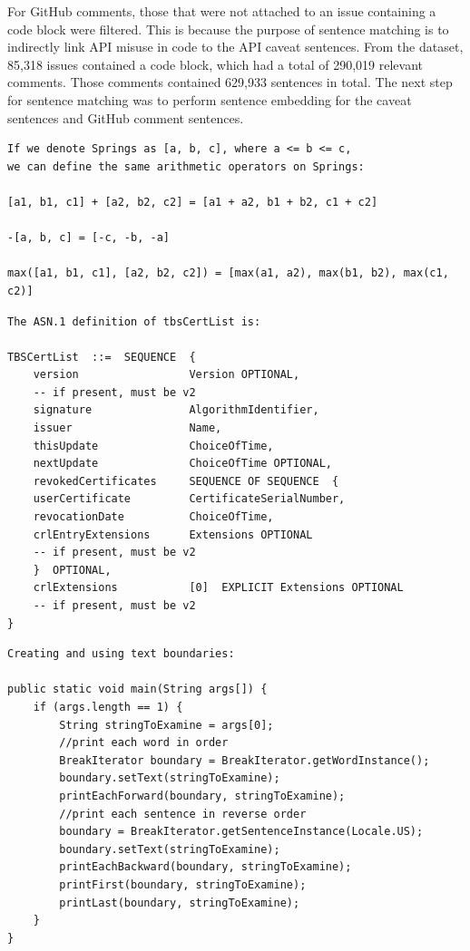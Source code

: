 For GitHub comments, those that were not attached to an issue containing a code block were filtered. This is because the purpose of sentence matching is to indirectly link API misuse in code to the API caveat sentences. From the dataset, 85,318 issues contained a code block, which had a total of 290,019 relevant comments. Those comments contained 629,933 sentences in total. The next step for sentence matching was to perform sentence embedding for the caveat sentences and GitHub comment sentences.

\begin{lstlisting}[label=invalid-caveat-1,caption={An example of a caveat sentence extracted from the \lstinline{javax.swing.Spring} documentation containing some snippets of code or mathematical expressions},float,frame=tb,numbers=none,language=None]
If we denote Springs as [a, b, c], where a <= b <= c, 
we can define the same arithmetic operators on Springs:

[a1, b1, c1] + [a2, b2, c2] = [a1 + a2, b1 + b2, c1 + c2]

-[a, b, c] = [-c, -b, -a]

max([a1, b1, c1], [a2, b2, c2]) = [max(a1, a2), max(b1, b2), max(c1, c2)]
\end{lstlisting}

\begin{lstlisting}[label=invalid-caveat-2,caption={An example of a caveat sentence extracted from the \lstinline{java.security.cert.X509CRL} documentation explaining the structure of a \lstinline{TBSCertList} object.},float,frame=tb,numbers=none,language=None]
The ASN.1 definition of tbsCertList is:

TBSCertList  ::=  SEQUENCE  {
	version                 Version OPTIONAL,
	-- if present, must be v2
	signature               AlgorithmIdentifier,
	issuer                  Name,
	thisUpdate              ChoiceOfTime,
	nextUpdate              ChoiceOfTime OPTIONAL,
	revokedCertificates     SEQUENCE OF SEQUENCE  {
	userCertificate         CertificateSerialNumber,
	revocationDate          ChoiceOfTime,
	crlEntryExtensions      Extensions OPTIONAL
	-- if present, must be v2
	}  OPTIONAL,
	crlExtensions           [0]  EXPLICIT Extensions OPTIONAL
	-- if present, must be v2
}
\end{lstlisting}

\begin{lstlisting}[label=invalid-caveat-3,caption={An example of a caveat sentence extracted from the \lstinline{java.text.BreakIterator} documentation that contains some sample code.},float,frame=tb,numbers=none,language=None]
Creating and using text boundaries:

public static void main(String args[]) {
	if (args.length == 1) {
		String stringToExamine = args[0];
		//print each word in order
		BreakIterator boundary = BreakIterator.getWordInstance();
		boundary.setText(stringToExamine);
		printEachForward(boundary, stringToExamine);
		//print each sentence in reverse order
		boundary = BreakIterator.getSentenceInstance(Locale.US);
		boundary.setText(stringToExamine);
		printEachBackward(boundary, stringToExamine);
		printFirst(boundary, stringToExamine);
		printLast(boundary, stringToExamine);
	}
}
\end{lstlisting}

